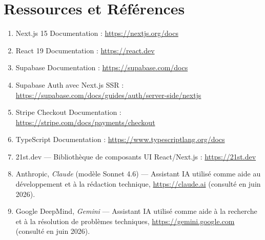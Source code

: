 \documentclass[12pt,a4paper,openany]{report}
\begin{document}
\chapter{Ressources et Références}

\begin{enumerate}
  \item Next.js 15 Documentation : \url{https://nextjs.org/docs}
  \item React 19 Documentation : \url{https://react.dev}
  \item Supabase Documentation : \url{https://supabase.com/docs}
  \item Supabase Auth avec Next.js SSR : \url{https://supabase.com/docs/guides/auth/server-side/nextjs}
  \item Stripe Checkout Documentation : \url{https://stripe.com/docs/payments/checkout}
  \item TypeScript Documentation : \url{https://www.typescriptlang.org/docs}
  \item 21st.dev — Bibliothèque de composants UI React/Next.js : \url{https://21st.dev}
  \item Anthropic, \textit{Claude} (modèle Sonnet 4.6) — Assistant IA utilisé comme aide au développement et à la rédaction technique, \url{https://claude.ai} (consulté en juin 2026).
  \item Google DeepMind, \textit{Gemini} — Assistant IA utilisé comme aide à la recherche et à la résolution de problèmes techniques, \url{https://gemini.google.com} (consulté en juin 2026).
\end{enumerate}

\end{document}
